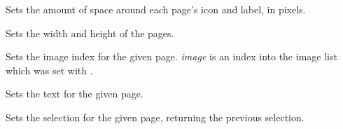
Sets the amount of space around each page's icon and label, in pixels.

\label{wxnotebooksetpagesize}


Sets the width and height of the pages.

\label{wxnotebooksetpageimage}


Sets the image index for the given page. {\it image} is an index into
the image list which was set with .

\label{wxnotebooksetpagetext}


Sets the text for the given page.

\label{wxnotebooksetselection}


Sets the selection for the given page, returning the previous selection.




